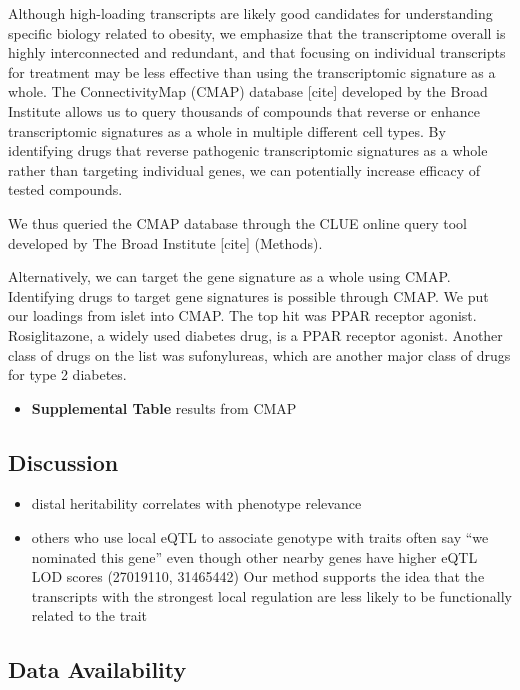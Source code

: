 \documentclass[
]{article}
\providecommand{\tightlist}{%
  \setlength{\itemsep}{0pt}\setlength{\parskip}{0pt}}
\begin{document}
Although high-loading transcripts are likely good candidates for
understanding specific biology related to obesity, we emphasize that the
transcriptome overall is highly interconnected and redundant, and that
focusing on individual transcripts for treatment may be less effective
than using the transcriptomic signature as a whole. The ConnectivityMap
(CMAP) database {[}cite{]} developed by the Broad Institute allows us to
query thousands of compounds that reverse or enhance transcriptomic
signatures as a whole in multiple different cell types. By identifying
drugs that reverse pathogenic transcriptomic signatures as a whole
rather than targeting individual genes, we can potentially increase
efficacy of tested compounds.

We thus queried the CMAP database through the CLUE online query tool
developed by The Broad Institute {[}cite{]} (Methods).

Alternatively, we can target the gene signature as a whole using CMAP.
Identifying drugs to target gene signatures is possible through CMAP. We
put our loadings from islet into CMAP. The top hit was PPAR receptor
agonist. Rosiglitazone, a widely used diabetes drug, is a PPAR receptor
agonist. Another class of drugs on the list was sufonylureas, which are
another major class of drugs for type 2 diabetes.

\begin{itemize}
\tightlist
\item
  \textbf{Supplemental Table} results from CMAP
\end{itemize}

\subsection{Discussion}\label{discussion}

\begin{itemize}
\item
  distal heritability correlates with phenotype relevance
\item
  others who use local eQTL to associate genotype with traits often say
  ``we nominated this gene'' even though other nearby genes have higher
  eQTL LOD scores (27019110, 31465442) Our method supports the idea that
  the transcripts with the strongest local regulation are less likely to
  be functionally related to the trait
\end{itemize}

\subsection{Data Availability}\label{data-availability}
\end{document}
